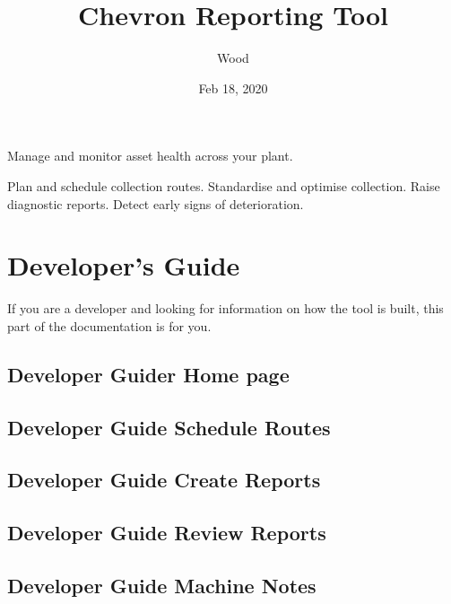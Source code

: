 \documentclass[letterpaper,10pt,english]{sphinxmanual}
\title{Chevron Reporting Tool}
\date{Feb 18, 2020}
\author{Wood}
\begin{document}
\pagestyle{empty}
\sphinxmaketitle
\pagestyle{plain}
\sphinxtableofcontents
\pagestyle{normal}
\label{\detokenize{index::doc}}



Manage and monitor asset health across your plant.

Plan and schedule collection routes. Standardise and optimise collection.
Raise diagnostic reports. Detect early signs of deterioration.


\chapter{Developer’s Guide}
\label{\detokenize{index:developer-s-guide}}
If you are a developer and looking for information on how the tool is built, this part of the documentation is for you.


\section{Developer Guider \sphinxhyphen{} Home page}
\label{\detokenize{home_d:developer-guider-home-page}}\label{\detokenize{home_d::doc}}

\section{Developer Guide \sphinxhyphen{} Schedule Routes}
\label{\detokenize{schedule_routes_d:developer-guide-schedule-routes}}\label{\detokenize{schedule_routes_d::doc}}

\section{Developer Guide \sphinxhyphen{} Create Reports}
\label{\detokenize{create_reports_d:developer-guide-create-reports}}\label{\detokenize{create_reports_d::doc}}

\section{Developer Guide \sphinxhyphen{} Review Reports}
\label{\detokenize{review_reports_d:developer-guide-review-reports}}\label{\detokenize{review_reports_d::doc}}

\section{Developer Guide \sphinxhyphen{} Machine Notes}
\label{\detokenize{machine_notes_d:developer-guide-machine-notes}}\label{\detokenize{machine_notes_d::doc}}
\end{document}
